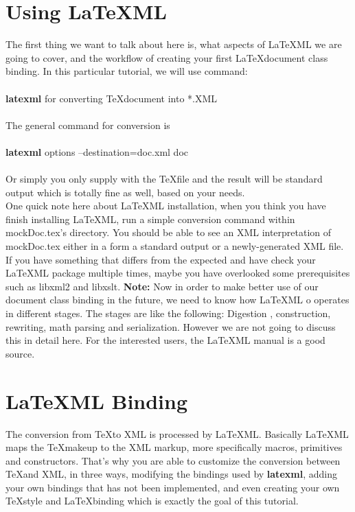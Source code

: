 \documentclass{book}
\begin{document}
\section{Using LaTeXML}
The first thing we want to talk about here is, what aspects of \LaTeX ML we are going to cover, and the 
workflow of creating your first \LaTeX document class binding. In this particular tutorial, we will use command:\\ \\
\textbf{latexml} for converting \TeX document into *.XML \\ \\
The general command for conversion is \\ \\
\textbf{latexml} {options} --destination=doc.xml doc \\ \\
Or simply you only supply with the \TeX file and the result will be standard output which is totally fine as well,
based on your needs. \\
One quick note here about \LaTeX ML installation, when you think you have finish installing \LaTeX ML, run
a simple conversion command within mockDoc.tex's directory. You should be able to see an XML interpretation of
mockDoc.tex either in a form a standard output or a newly-generated XML file. If you have something that differs from
the expected and have check your \LaTeX ML package multiple times, maybe you have overlooked some prerequisites such as 
libxml2 and libxslt. 
\textbf{Note:}
Now in order to make better use of our document class binding in the future, we need to know how \LaTeX ML o
operates in different stages. The stages are like the following: Digestion , construction, rewriting, math parsing and serialization.
However we are not going to discuss this in detail here. For the interested users, the \LaTeX ML manual is a good source.
\section{LaTeXML Binding}
The conversion from \TeX to XML is processed by \LaTeX ML. Basically \LaTeX ML maps the \TeX makeup to
the XML markup, more specifically macros, primitives and constructors. That's why you are able to customize the conversion 
between \TeX  and XML, in three ways, modifying the bindings used by \textbf{latexml}, adding your own bindings that has not been
implemented, and even creating your own \TeX style and \LaTeX binding which is exactly the goal of this tutorial.
\end{document}
